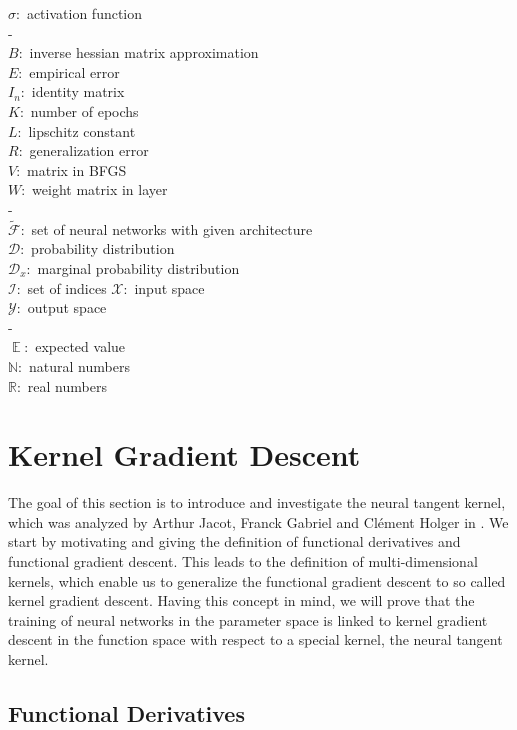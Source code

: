 \documentclass[11pt, a4paper]{article}
\newcommand{\N}{\mathbb{N}}
\newcommand{\R}{\mathbb{R}}
\newcommand{\D}{\mathcal{D}}
\newcommand{\F}{\mathcal{F}}
\newcommand{\I}{\mathcal{I}}
\newcommand{\X}{\mathcal{X}}
\newcommand{\Y}{\mathcal{Y}}
\DeclareMathOperator*{\E}{\mathbb{E}}
\begin{document}
$\sigma:$ activation function \\
- \\
$B:$ inverse hessian matrix approximation \\
$E:$ empirical error \\
$I_n:$ identity matrix \\
$K:$ number of epochs \\
$L:$ lipschitz constant \\
$R:$ generalization error \\
$V:$ matrix in BFGS \\
$W:$ weight matrix in layer \\
- \\
$\tilde{\F}:$ set of neural networks with given architecture \\
$\D:$ probability distribution \\
$\D_x:$ marginal probability distribution \\
$\I:$ set of indices
$\X:$ input space \\
$\Y:$ output space \\
- \\
$\E:$ expected value \\
$\N:$ natural numbers \\
$\R:$ real numbers \\


\pagebreak
\section{Kernel Gradient Descent} \label{sec:kernel}

The goal of this section is to introduce and investigate the neural tangent kernel, which was analyzed by Arthur Jacot, Franck Gabriel and Cl\'{e}ment Holger in \cite{NTK}. We start by motivating and giving the definition of functional derivatives and functional gradient descent. This leads to the definition of multi-dimensional kernels, which enable us to generalize the functional gradient descent to so called kernel gradient descent. Having this concept in mind, we will prove that the training of neural networks in the parameter space is linked to kernel gradient descent in the function space with respect to a special kernel, the neural tangent kernel.
\subsection{Functional Derivatives}
\end{document}
